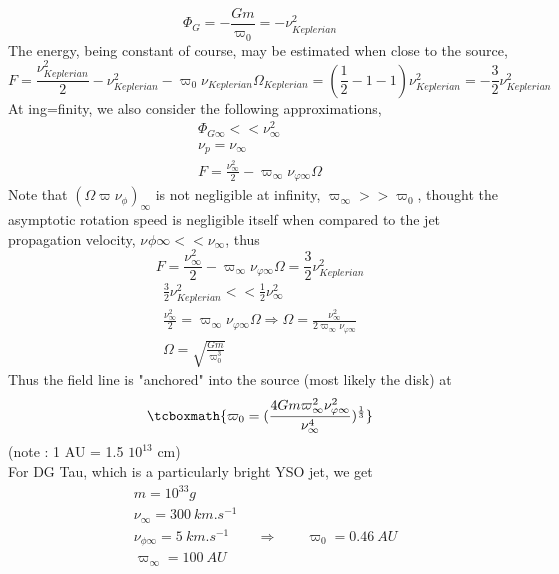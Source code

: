 \documentclass[10pt,a4paper,english]{article}
\begin{document}
\begin{equation}
  \Phi_{G} = -\frac{Gm}{\varpi_{0}}=-\nu_{Keplerian}^{2}
\end{equation}
The energy, being constant of course, may be estimated when close to the source,
\begin{equation}
   F = \frac{\nu^{2}_{Keplerian}}{2}-\nu^{2}_{Keplerian}-\varpi_{0}\nu_{Keplerian}\Omega_{Keplerian}=(\frac{1}{2}-1-1)\nu^{2}_{Keplerian}=-\frac{3}{2}\nu^{2}_{Keplerian}
\end{equation}
At ing=finity, we also consider the following approximations,
\begin{align*}
   \Phi_{G\infty} << \nu_{\infty}^{2} \\
   \nu_{p}=\nu_{\infty} \\
   F = \frac{\nu_{\infty}^{2}}{2}-\varpi_{\infty}\nu_{\varphi\infty}\Omega
\end{align*}
Note that $(\Omega\varpi\nu_{\phi})_{\infty}$ is not negligible at infinity, $\varpi_{\infty} >> \varpi_{0}$, thought the asymptotic rotation speed is negligible itself when compared to the jet propagation velocity, $\nu_{}\phi\infty << \nu_{\infty}$, thus
\begin{equation}
   F = \frac{\nu_{\infty}^{2}}{2}-\varpi_{\infty}\nu_{\varphi\infty}\Omega=\frac{3}{2}\nu^{2}_{Keplerian}
\end{equation}
\begin{align*}
   \frac{3}{2}\nu^{2}_{Keplerian} << \frac{1}{2}\nu^{2}_{\infty} \\
   \frac{\nu^{2}_{\infty}}{2}=\varpi_{\infty}\nu_{\varphi\infty}\Omega \Rightarrow \Omega = \frac{\nu_{\infty}^{2}}{2\varpi_{\infty}\nu_{\varphi\infty}} \\
   \Omega = \sqrt{\frac{Gm}{\varpi_{0}^{3}}}
\end{align*}
Thus the field line is "anchored" into the source (most likely the disk) at
\begin{equation}
    \tcboxmath{
     \varpi_{0}=(\frac{4Gm\varpi^{2}_{\infty}\nu_{\varphi\infty}^{2}}{\nu_{\infty}^{4}})^{\frac{1}{3}}
     }
\end{equation}
(note : 1 AU = 1.5 $10^{13}$ cm)
\\
For DG Tau, which is a particularly bright YSO jet, we get
\begin{align*}
&   m = 10^{33}g \\
&   \nu_{\infty} = 300\:km.s^{-1} \\
&   \nu_{\phi\infty} = 5\:km.s^{-1} \;\;\;\;\;\;\; \Rightarrow \;\;\;\;\;\;\; \varpi_{0}=0.46\:AU \\
&   \varpi_{\infty} = 100\:AU \\
\end{align*}
\end{document}
